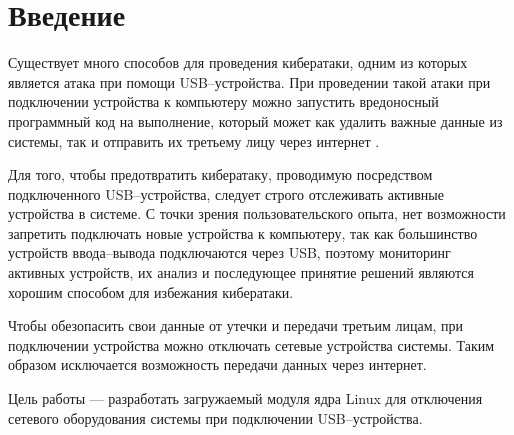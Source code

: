 \chapter*{Введение}

Существует много способов для проведения кибератаки, одним из которых является атака при помощи USB--устройства. При проведении такой атаки при подключении устройства к компьютеру можно запустить вредоносный программный код на выполнение, который может как удалить важные данные из системы, так и отправить их третьему лицу через интернет \cite{usbmalware}.

Для того, чтобы предотвратить кибератаку, проводимую посредством подключенного USB--устройства, следует строго отслеживать активные устройства в системе. С точки зрения пользовательского опыта, нет возможности запретить подключать новые устройства к компьютеру, так как большинство устройств ввода--вывода подключаются через USB, поэтому мониторинг активных устройств, их анализ  и последующее принятие решений являются хорошим способом для избежания кибератаки.

Чтобы обезопасить свои данные от утечки и передачи третьим лицам, при подключении устройства можно отключать сетевые устройства системы. Таким образом исключается возможность передачи данных через интернет.

Цель работы --- разработать загружаемый модуля ядра Linux для отключения сетевого оборудования системы при подключении USB--устройства.